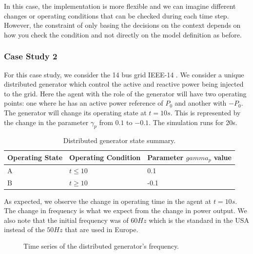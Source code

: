 \documentclass{report}
\begin{document}
In this case, the implementation is more flexible and we can imagine different changes or operating conditions that can be checked during each time step. However, the constraint of only basing the decisions on the context depends on how you check the condition and not directly on the model definition as before. 

\subsubsection{Case Study 2}

For this case study, we consider the 14 bus grid IEEE-14 \cite{grids:ieee14}. We consider a unique distributed generator which control the active and reactive power being injected to the grid. Here the agent with the role of the generator will have two operating points: one where he has an active power reference of $P_0$ and another with $-P_0$. The generator will change its operating state at $t=10s$. This is represented by the change in the parameter $\gamma_p$ from $0.1$ to $-0.1$. The simulation runs for 20s.\\ 
\begin{table}[H]
    \centering
    \begin{tabular}{|l|l|l|}
    \hline
    Operating State & Operating Condition  & Parameter $gamma_p$ value \\ \hline
    A               & $t \leq 10$ & 0.1  \\ \hline
    B               & $t \geq 10$ & -0.1  \\ \hline
    \end{tabular}
    \caption{Distributed generator state summary.}
\end{table}

As expected, we observe the change in operating time in the agent at $t =10s$. The change in frequency is what we expect from the change in power output. We also note that the initial frequency was of $60 Hz$ which is the standard in the USA instead of the $50 Hz$ that are used in Europe.

\begin{figure}[H]  %
    \centering
    \resizebox{\linewidth}{!}{}
% 

    \caption{Time series of the distributed generator's frequency.}
    \label{fig:sample_figure}
\end{figure}
\end{document}
